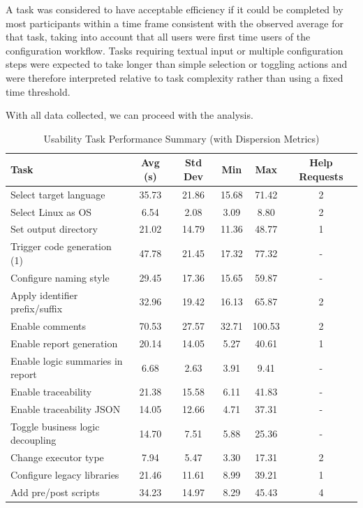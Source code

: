 A task was considered to have acceptable efficiency if it could be completed by most participants within a time frame consistent with the observed average for that task, taking into account that all users were first time users of the configuration workflow. Tasks requiring textual input or multiple configuration steps were expected to take longer than simple selection or toggling actions and were therefore interpreted relative to task complexity rather than using a fixed time threshold.

With all data collected, we can proceed with the analysis.

\begin{table}[htbp]
	\centering
	\caption{Usability Task Performance Summary (with Dispersion Metrics)}
	\label{tab:usability_tasks}
	\begin{tabular}{lccccc}
		\toprule
		\textbf{Task} & \textbf{Avg (s)} & \textbf{Std Dev} & \textbf{Min} & \textbf{Max} & \textbf{Help Requests} \\
		\midrule
		Select target language 				& 35.73 & 21.86 & 15.68 & 71.42 & 2 \\
		Select Linux as OS	 				& 6.54  & 2.08  & 3.09  & 8.80  & 2 \\
		Set output directory 				& 21.02 & 14.79 & 11.36 & 48.77 & 1 \\
		Trigger code generation (1)			& 47.78 & 21.45 & 17.32 & 77.32 & - \\
		Configure naming style 				& 29.45 & 17.36 & 15.65 & 59.87 & - \\
		Apply identifier prefix/suffix 		& 32.96 & 19.42 & 16.13 & 65.87 & 2 \\
		Enable comments 					& 70.53 & 27.57 & 32.71 & 100.53 & 2 \\
		Enable report generation			& 20.14 & 14.05 & 5.27  & 40.61 & 1 \\
		Enable logic summaries in report	& 6.68  & 2.63  & 3.91  & 9.41  & - \\
		Enable traceability					& 21.38 & 15.58 & 6.11  & 41.83 & - \\
		Enable traceability JSON			& 14.05 & 12.66 & 4.71  & 37.31 & - \\
		Toggle business logic decoupling 	& 14.70 & 7.51  & 5.88  & 25.36 & - \\
		Change executor type 				& 7.94  & 5.47  & 3.30  & 17.31 & 2 \\
		Configure legacy libraries 			& 21.46 & 11.61 & 8.99  & 39.21 & 1 \\
		Add pre/post scripts 				& 34.23 & 14.97 & 8.29  & 45.43 & 4 \\

\end{tabular}
\end{table}
